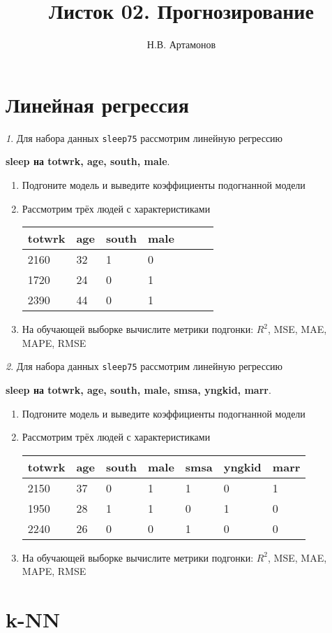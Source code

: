 \documentclass[12pt]{article}
\title{Листок 02. Прогнозирование}
\author{Н.В. Артамонов}
\theoremstyle{remark}
\newtheorem{exercise}{}[section]
\begin{document}
\maketitle

\tableofcontents

\section{Линейная регрессия}

\begin{exercise}
Для набора данных \texttt{sleep75} рассмотрим линейную регрессию 
\begin{center}
	\textbf{sleep на totwrk, age, south, male}.
\end{center}
\begin{enumerate}
	\item Подгоните модель и выведите коэффициенты подогнанной модели
	\item Рассмотрим трёх людей с характеристиками
	\begin{center}
		\begin{tabular}{|l|l|l|l|l|l|l|}\hline
			totwrk & age & south & male \\ \hline\hline
			2160 & 32 & 1 & 0  \\
			1720 & 24 & 0 & 1 \\  
			2390 & 44 & 0 & 1 \\ \hline
		\end{tabular}
	\end{center}
	\item На обучающей выборке вычислите метрики подгонки: \(R^2\), 
	MSE, MAE, MAPE, RMSE
\end{enumerate}
\end{exercise}

\begin{exercise}
Для набора данных \texttt{sleep75} рассмотрим линейную регрессию 
\begin{center}
	\textbf{sleep на totwrk, age, south, male, smsa, yngkid, marr}.
\end{center}
\begin{enumerate}
	\item Подгоните модель и выведите коэффициенты подогнанной модели
	\item Рассмотрим трёх людей с характеристиками
	\begin{center}
		\begin{tabular}{|l|l|l|l|l|l|l|}\hline
			totwrk & age & south & male & smsa & yngkid & marr \\ \hline\hline
			2150 & 37 & 0 & 1 & 1 & 0 & 1  \\
			1950 & 28 & 1 & 1 & 0 & 1 & 0 \\  
			2240 & 26 & 0 & 0 & 1 & 0 & 0 \\ \hline
		\end{tabular}
	\end{center}
	\item На обучающей выборке вычислите метрики подгонки: \(R^2\), 
	MSE, MAE, MAPE, RMSE
\end{enumerate}
\end{exercise}

\section{k-NN}
\end{document}
